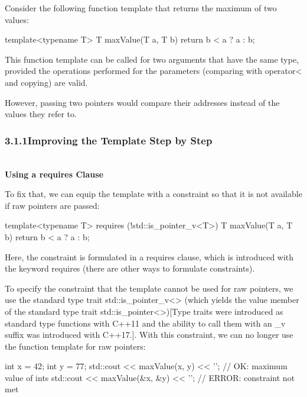 

Consider the following function template that returns the maximum of two values:

\begin{cpp}
template<typename T>
T maxValue(T a, T b) {
	return b < a ? a : b;
}
\end{cpp}

This function template can be called for two arguments that have the same type, provided the operations performed for the parameters (comparing with operator< and copying) are valid.

However, passing two pointers would compare their addresses instead of the values they refer to.

\subsubsection*{ 3.1.1\hspace{0.2cm}Improving the Template Step by Step}

\noindent
\hspace*{\fill} \\ %
\textbf{Using a requires Clause}


To fix that, we can equip the template with a constraint so that it is not available if raw pointers are passed:

\begin{cpp}
template<typename T>
requires (!std::is_pointer_v<T>)
T maxValue(T a, T b)
{
	return b < a ? a : b;
}
\end{cpp}

Here, the constraint is formulated in a requires clause, which is introduced with the keyword requires (there are other ways to formulate constraints).

To specify the constraint that the template cannot be used for raw pointers, we use the standard type trait std::is\_pointer\_v<> (which yields the value member of the standard type trait std::is\_pointer<>)[Type traits were introduced as standard type functions with C++11 and the ability to call them with an \_v suffix was introduced with C++17.]. With this constraint, we can no longer use the function template for raw pointers:

\begin{cpp}
int x = 42;
int y = 77;
std::cout << maxValue(x, y) << '\n'; // OK: maximum value of ints
std::cout << maxValue(&x, &y) << '\n'; // ERROR: constraint not met
\end{cpp}

